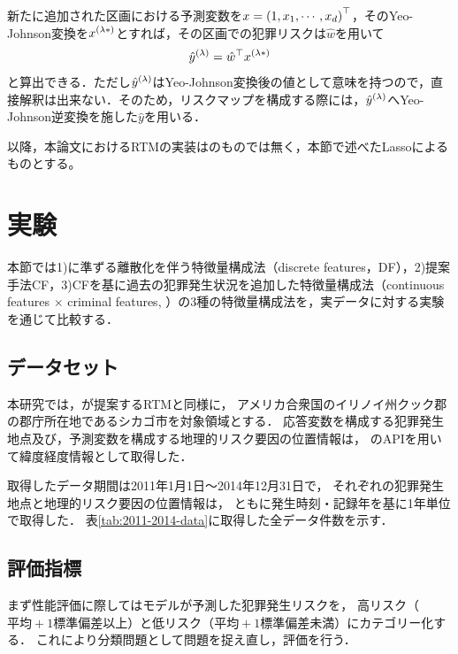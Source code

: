 新たに追加された区画における予測変数を$x={(1, x_1, \cdots, x_d)}^\top$，そのYeo-Johnson変換を${x}^{(\lambda*)}$とすれば，その区画での犯罪リスクは$\hat w$を用いて
\begin{align*}
 {{\hat y}^{(\lambda)}} = {\hat w}^\top {x}^{(\lambda*)}
\end{align*}
と算出できる．ただし${\hat y}^{(\lambda)}$はYeo-Johnson変換後の値として意味を持つので，直接解釈は出来ない．そのため，リスクマップを構成する際には，${\hat y}^{(\lambda)}$へYeo-Johnson逆変換を施した$\hat y$を用いる．

 
以降，本論文におけるRTMの実装は\cite{caplan2015risk}のものでは無く，本節で述べたLassoによるものとする。



\section{実験}

本節では1)\cite{caplan2015risk}に準ずる離散化を伴う特徴量構成法（discrete features，DF），2)提案手法CF，3)CFを基に過去の犯罪発生状況\cite{大山智也2020日本}を追加した特徴量構成法（continuous features $\times$ criminal features, \cfsq）の3種の特徴量構成法を，実データに対する実験を通じて比較する．

\subsection{データセット}
本研究では，\cite{caplan2015risk}が提案するRTMと同様に，
アメリカ合衆国のイリノイ州クック郡の郡庁所在地であるシカゴ市を対象領域とする．
応答変数を構成する犯罪発生地点及び，予測変数を構成する地理的リスク要因の位置情報は，
\cite{ChicagoDataPortal}のAPIを用いて緯度経度情報として取得した．

取得したデータ期間は2011年1月1日〜2014年12月31日で，
それぞれの犯罪発生地点と地理的リスク要因の位置情報は，
ともに発生時刻・記録年を基に1年単位で取得した．
表\ref{tab:2011-2014-data}に取得した全データ件数を示す．



\subsection{評価指標}\label{sec:criteria}
まず性能評価に際してはモデルが予測した犯罪発生リスクを，
高リスク（$平均+1標準偏差以上$）と低リスク（$平均+1標準偏差未満$）にカテゴリー化する．
これにより分類問題として問題を捉え直し，評価を行う．

